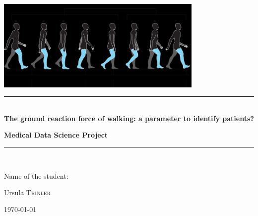 \begin{titlepage} %
	\newcommand{\HRule}{\rule{\linewidth}{0.5mm}} %
	
	\center %
	
	
	\includegraphics[width=0.75\textwidth]{Introwalking.png}

	
	\vspace{1.5cm}
	
	\HRule\\[0.6cm]
	
	{\huge\bfseries The ground reaction force of walking: a parameter to identify patients?} \\
	
	\vspace{1.0cm}
	
	{\large\bfseries Medical Data Science Project}\\[0.4cm] %
	
	\HRule\\[1.5cm]
	
	\large

	Name of the student:\\ 

	\huge

	Ursula \textsc{Trinler}

	
	\vfill\vfill %
	
	{\large\today} %
	
	\vfill %
	
\end{titlepage}


%